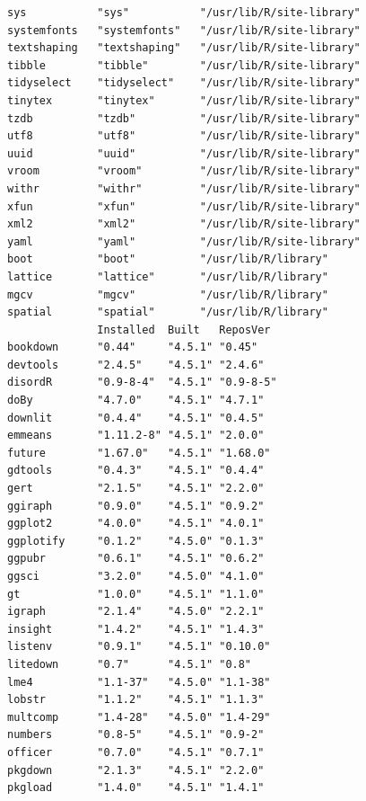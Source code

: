 \documentclass[
  letterpaper,
  DIV=11,
  numbers=noendperiod]{scrreprt}
\begin{document}
\begin{verbatim}
sys           "sys"           "/usr/lib/R/site-library"                       
systemfonts   "systemfonts"   "/usr/lib/R/site-library"                       
textshaping   "textshaping"   "/usr/lib/R/site-library"                       
tibble        "tibble"        "/usr/lib/R/site-library"                       
tidyselect    "tidyselect"    "/usr/lib/R/site-library"                       
tinytex       "tinytex"       "/usr/lib/R/site-library"                       
tzdb          "tzdb"          "/usr/lib/R/site-library"                       
utf8          "utf8"          "/usr/lib/R/site-library"                       
uuid          "uuid"          "/usr/lib/R/site-library"                       
vroom         "vroom"         "/usr/lib/R/site-library"                       
withr         "withr"         "/usr/lib/R/site-library"                       
xfun          "xfun"          "/usr/lib/R/site-library"                       
xml2          "xml2"          "/usr/lib/R/site-library"                       
yaml          "yaml"          "/usr/lib/R/site-library"                       
boot          "boot"          "/usr/lib/R/library"                            
lattice       "lattice"       "/usr/lib/R/library"                            
mgcv          "mgcv"          "/usr/lib/R/library"                            
spatial       "spatial"       "/usr/lib/R/library"                            
              Installed  Built   ReposVer  
bookdown      "0.44"     "4.5.1" "0.45"    
devtools      "2.4.5"    "4.5.1" "2.4.6"   
disordR       "0.9-8-4"  "4.5.1" "0.9-8-5" 
doBy          "4.7.0"    "4.5.1" "4.7.1"   
downlit       "0.4.4"    "4.5.1" "0.4.5"   
emmeans       "1.11.2-8" "4.5.1" "2.0.0"   
future        "1.67.0"   "4.5.1" "1.68.0"  
gdtools       "0.4.3"    "4.5.1" "0.4.4"   
gert          "2.1.5"    "4.5.1" "2.2.0"   
ggiraph       "0.9.0"    "4.5.1" "0.9.2"   
ggplot2       "4.0.0"    "4.5.1" "4.0.1"   
ggplotify     "0.1.2"    "4.5.0" "0.1.3"   
ggpubr        "0.6.1"    "4.5.1" "0.6.2"   
ggsci         "3.2.0"    "4.5.0" "4.1.0"   
gt            "1.0.0"    "4.5.1" "1.1.0"   
igraph        "2.1.4"    "4.5.0" "2.2.1"   
insight       "1.4.2"    "4.5.1" "1.4.3"   
listenv       "0.9.1"    "4.5.1" "0.10.0"  
litedown      "0.7"      "4.5.1" "0.8"     
lme4          "1.1-37"   "4.5.0" "1.1-38"  
lobstr        "1.1.2"    "4.5.1" "1.1.3"   
multcomp      "1.4-28"   "4.5.0" "1.4-29"  
numbers       "0.8-5"    "4.5.1" "0.9-2"   
officer       "0.7.0"    "4.5.1" "0.7.1"   
pkgdown       "2.1.3"    "4.5.1" "2.2.0"   
pkgload       "1.4.0"    "4.5.1" "1.4.1"   

\end{verbatim}
\end{document}
